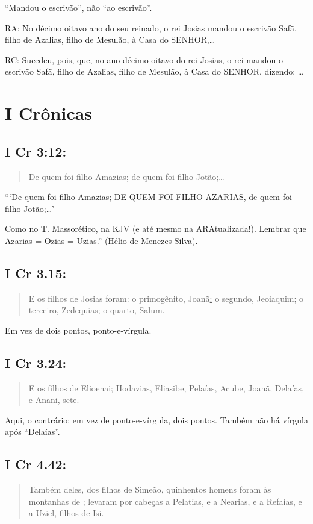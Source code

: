 ``Mandou o escrivão'', não ``ao escrivão''.

RA: No décimo oitavo ano do seu reinado, o rei Josias mandou o escrivão Safã, filho de Azalias, filho de Mesulão, à Casa do SENHOR,\ldots

RC: Sucedeu, pois, que, no ano décimo oitavo do rei Josias, o rei mandou o escrivão Safã, filho de Azalias, filho de Mesulão, à Casa do SENHOR, dizendo: \ldots

\section{I Crônicas}
\subsection{I Cr 3:12:}
\begin{quote}
    \small
De quem foi filho Amazias; de quem foi filho Jotão;\ldots
\end{quote}

```De quem foi filho Amazias; DE QUEM FOI FILHO AZARIAS, de quem foi filho Jotão;\ldots'

Como no T. Massorético, na KJV (e até mesmo na ARAtualizada!). Lembrar que Azarias = Ozias = Uzias.'' (Hélio de Menezes Silva).

\subsection{I Cr 3.15:}
\begin{quote}
    \small
E os filhos de Josias foram: o primogênito, Joanã\uline{:} o segundo, Jeoiaquim; o terceiro, Zedequias; o quarto, Salum.
\end{quote}

Em vez de dois pontos, ponto-e-vírgula.

\subsection{I Cr 3.24:}
\begin{quote}
    \small
E os filhos de Elioenai\uline{;} Hodavias, Eliasibe, Pelaías, Acube, Joanã, Delaías\uline{,} e Anani, sete.
\end{quote}

Aqui, o contrário: em vez de ponto-e-vírgula, dois pontos. Também não
há vírgula após ``Delaías''.

\subsection{I Cr 4.42:}
\begin{quote}
    \small
Também deles, dos filhos de Simeão, quinhentos homens foram às montanhas de ; levaram por cabeças a Pelatias, e a Nearias, e a Refaías, e a Uziel, filhos de Isi.
\end{quote}


